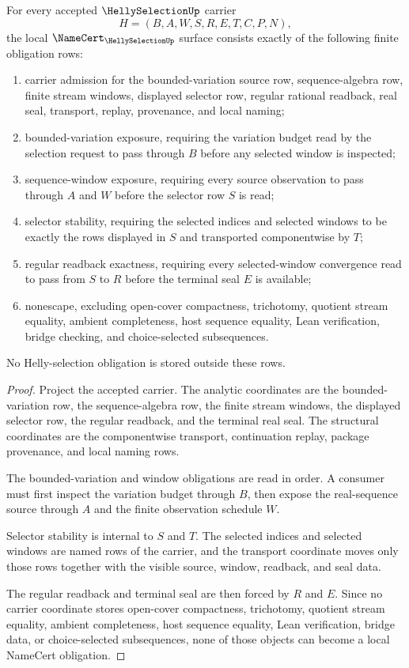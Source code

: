 \begin{theorem}\label{thm:helly-selection-namecert-obligations}
For every accepted $\HellySelectionUp$ carrier
$$
H=(B,A,W,S,R,E,T,C,P,N),
$$
the local $\NameCert_{\HellySelectionUp}$ surface consists exactly of the following finite obligation rows:
\begin{enumerate}
\item carrier admission for the bounded-variation source row, sequence-algebra row, finite stream windows, displayed selector row, regular rational readback, real seal, transport, replay, provenance, and local naming;
\item bounded-variation exposure, requiring the variation budget read by the selection request to pass through $B$ before any selected window is inspected;
\item sequence-window exposure, requiring every source observation to pass through $A$ and $W$ before the selector row $S$ is read;
\item selector stability, requiring the selected indices and selected windows to be exactly the rows displayed in $S$ and transported componentwise by $T$;
\item regular readback exactness, requiring every selected-window convergence read to pass from $S$ to $R$ before the terminal seal $E$ is available;
\item nonescape, excluding open-cover compactness, trichotomy, quotient stream equality, ambient completeness, host sequence equality, Lean verification, bridge checking, and choice-selected subsequences.
\end{enumerate}
No Helly-selection obligation is stored outside these rows.
\end{theorem}
\begin{proof}
Project the accepted carrier. The analytic coordinates are the bounded-variation row, the sequence-algebra row, the finite stream windows, the displayed selector row, the regular readback, and the terminal real seal. The structural coordinates are the componentwise transport, continuation replay, package provenance, and local naming rows.

The bounded-variation and window obligations are read in order. A consumer must first inspect the variation budget through $B$, then expose the real-sequence source through $A$ and the finite observation schedule $W$.

Selector stability is internal to $S$ and $T$. The selected indices and selected windows are named rows of the carrier, and the transport coordinate moves only those rows together with the visible source, window, readback, and seal data.

The regular readback and terminal seal are then forced by $R$ and $E$. Since no carrier coordinate stores open-cover compactness, trichotomy, quotient stream equality, ambient completeness, host sequence equality, Lean verification, bridge data, or choice-selected subsequences, none of those objects can become a local NameCert obligation.
\end{proof}

